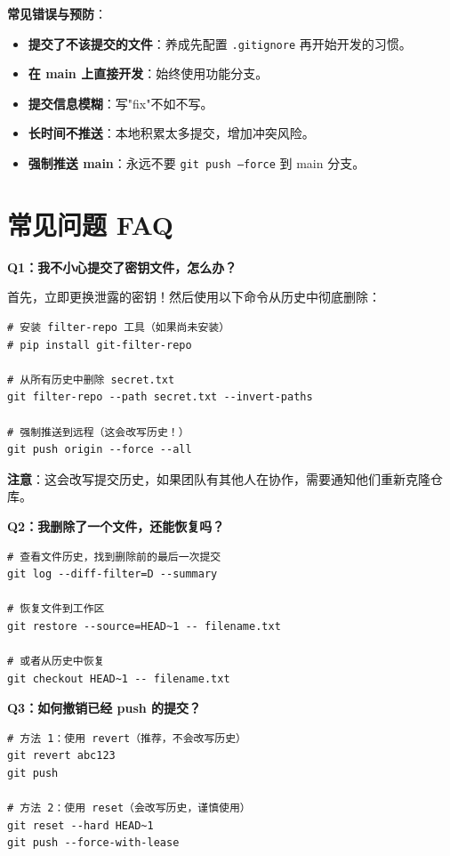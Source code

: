 \documentclass[12pt,a4paper,openany]{ctexbook}
\begin{document}
\begin{warnbox}
\textbf{常见错误与预防}：
\begin{itemize}
  \item \textbf{提交了不该提交的文件}：养成先配置 \texttt{.gitignore} 再开始开发的习惯。
  \item \textbf{在 main 上直接开发}：始终使用功能分支。
  \item \textbf{提交信息模糊}：写"fix"不如不写。
  \item \textbf{长时间不推送}：本地积累太多提交，增加冲突风险。
  \item \textbf{强制推送 main}：永远不要 \texttt{git push --force} 到 main 分支。
\end{itemize}
\end{warnbox}

\section{常见问题 FAQ}

\medskip
\textbf{Q1：我不小心提交了密钥文件，怎么办？}

首先，立即更换泄露的密钥！然后使用以下命令从历史中彻底删除：

\begin{lstlisting}[style=shell]
# 安装 filter-repo 工具（如果尚未安装）
# pip install git-filter-repo

# 从所有历史中删除 secret.txt
git filter-repo --path secret.txt --invert-paths

# 强制推送到远程（这会改写历史！）
git push origin --force --all
\end{lstlisting}

\textbf{注意}：这会改写提交历史，如果团队有其他人在协作，需要通知他们重新克隆仓库。
\medskip

\medskip
\textbf{Q2：我删除了一个文件，还能恢复吗？}

\begin{lstlisting}[style=shell]
# 查看文件历史，找到删除前的最后一次提交
git log --diff-filter=D --summary

# 恢复文件到工作区
git restore --source=HEAD~1 -- filename.txt

# 或者从历史中恢复
git checkout HEAD~1 -- filename.txt
\end{lstlisting}
\medskip

\medskip
\textbf{Q3：如何撤销已经 push 的提交？}

\begin{lstlisting}[style=shell]
# 方法 1：使用 revert（推荐，不会改写历史）
git revert abc123
git push

# 方法 2：使用 reset（会改写历史，谨慎使用）
git reset --hard HEAD~1
git push --force-with-lease
\end{lstlisting}
\medskip
\end{document}
